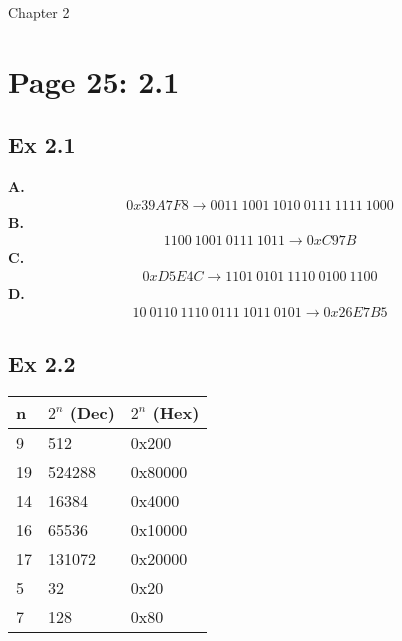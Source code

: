 


\begin{center}
    \Huge Chapter 2
\end{center}

\section{Page 25: 2.1}
\subsection{Ex 2.1}
\textbf{A.}
\begin{align*}
    0x39A7F8 \rightarrow 0011\ 1001\ 1010\ 0111\ 1111\ 1000
\end{align*}
\textbf{B.}
\begin{align*}
    1100\ 1001\ 0111\ 1011 \rightarrow 0xC97B
\end{align*}
\textbf{C.}
\begin{align*}
    0xD5E4C \rightarrow 1101\ 0101\ 1110\ 0100\ 1100
\end{align*}
\textbf{D.}
\begin{align*}
    10\ 0110\ 1110\ 0111\ 1011\ 0101 \rightarrow 0x26E7B5
\end{align*}

\subsection{Ex 2.2}
\begin{table}[h]
    \centering
    \begin{tabular}{lll}
        \toprule
        n & $2^n$ (Dec) & $2^n$ (Hex)\\
        \midrule
        9 & 512 & 0x200\\
        19 & 524288 & 0x80000\\
        14 & 16384 & 0x4000\\
        16 & 65536 & 0x10000\\
        17 & 131072 & 0x20000\\
        5 & 32 & 0x20\\
        7 & 128 & 0x80\\
        \bottomrule
    \end{tabular}
\end{table}

